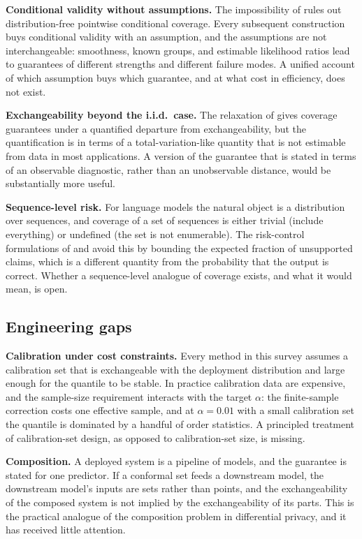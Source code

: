 \documentclass[a4paper,longmktitle]{cas-sc}
\begin{document}
\textbf{Conditional validity without assumptions.} The impossibility of \cite{Barber2021} rules out distribution-free pointwise conditional coverage. Every subsequent construction buys conditional validity with an assumption, and the assumptions are not interchangeable: smoothness, known groups, and estimable likelihood ratios lead to guarantees of different strengths and different failure modes. A unified account of which assumption buys which guarantee, and at what cost in efficiency, does not exist.

\textbf{Exchangeability beyond the i.i.d.\ case.} The relaxation of \cite{Beyond} gives coverage guarantees under a quantified departure from exchangeability, but the quantification is in terms of a total-variation-like quantity that is not estimable from data in most applications. A version of the guarantee that is stated in terms of an observable diagnostic, rather than an unobservable distance, would be substantially more useful.

\textbf{Sequence-level risk.} For language models the natural object is a distribution over sequences, and coverage of a set of sequences is either trivial (include everything) or undefined (the set is not enumerable). The risk-control formulations of \cite{CRC_LLM} and \cite{HierCRC} avoid this by bounding the expected fraction of unsupported claims, which is a different quantity from the probability that the output is correct. Whether a sequence-level analogue of coverage exists, and what it would mean, is open.

\subsection{Engineering gaps}

\textbf{Calibration under cost constraints.} Every method in this survey assumes a calibration set that is exchangeable with the deployment distribution and large enough for the quantile to be stable. In practice calibration data are expensive, and the sample-size requirement interacts with the target $\alpha$: the finite-sample correction costs one effective sample, and at $\alpha=0.01$ with a small calibration set the quantile is dominated by a handful of order statistics. A principled treatment of calibration-set design, as opposed to calibration-set size, is missing.

\textbf{Composition.} A deployed system is a pipeline of models, and the guarantee is stated for one predictor. If a conformal set feeds a downstream model, the downstream model's inputs are sets rather than points, and the exchangeability of the composed system is not implied by the exchangeability of its parts. This is the practical analogue of the composition problem in differential privacy, and it has received little attention.
\end{document}
